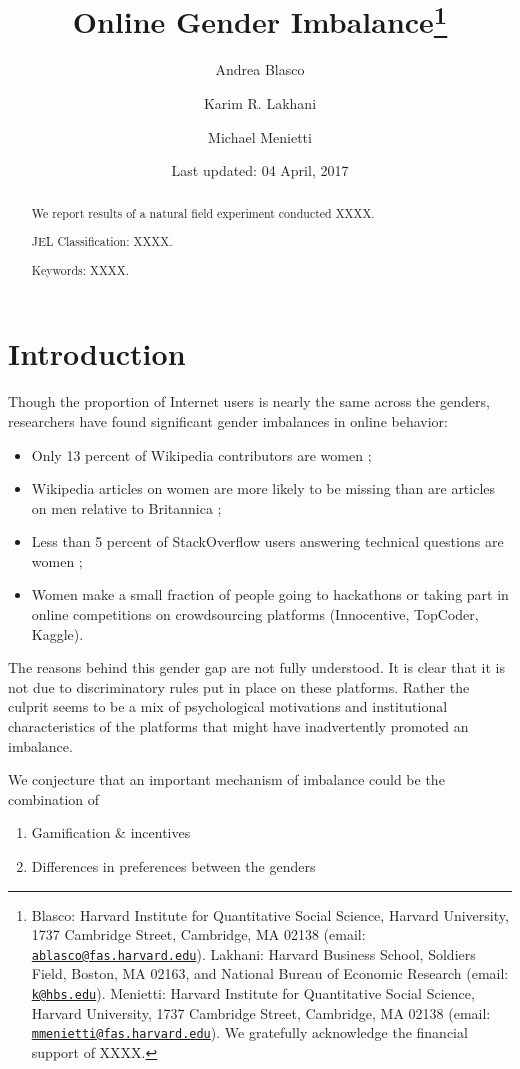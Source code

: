 \documentclass[12pt, titlepage]{article}
\institute{}
\title{Online Gender Imbalance\thanks{Blasco: Harvard Institute for Quantitative Social Science, Harvard
University, 1737 Cambridge Street, Cambridge, MA 02138 (email:
\href{mailto:ablasco@fas.harvard.edu}{\nolinkurl{ablasco@fas.harvard.edu}}).
Lakhani: Harvard Business School, Soldiers Field, Boston, MA 02163, and
National Bureau of Economic Research (email:
\href{mailto:k@hbs.edu}{\nolinkurl{k@hbs.edu}}). Menietti: Harvard
Institute for Quantitative Social Science, Harvard University, 1737
Cambridge Street, Cambridge, MA 02138 (email:
\href{mailto:mmenietti@fas.harvard.edu}{\nolinkurl{mmenietti@fas.harvard.edu}}).
We gratefully acknowledge the financial support of XXXX.}}
\author{Andrea Blasco \and Karim R. Lakhani \and Michael Menietti}
\date{Last updated: 04 April, 2017}
\providecommand{\tightlist}{%
  \setlength{\itemsep}{0pt}\setlength{\parskip}{0pt}}
\begin{document}
\maketitle
\begin{abstract}
We report results of a natural field experiment conducted XXXX.

\smallskip\noindent 
JEL Classification: XXXX.

\smallskip\noindent 
Keywords: XXXX.
\end{abstract}


\clearpage

\section{Introduction}\label{introduction}

Though the proportion of Internet users is nearly the same across the
genders, researchers have found significant gender imbalances in online
behavior:

\begin{itemize}
\tightlist
\item
  Only 13 percent of Wikipedia contributors are women
  \citep{hill2013wikipedia};
\item
  Wikipedia articles on women are more likely to be missing than are
  articles on men relative to Britannica \citep{reagle2011gender};
\item
  Less than 5 percent of StackOverflow users answering technical
  questions are women \citep{vasilescu2012gender};
\item
  Women make a small fraction of people going to hackathons or taking
  part in online competitions on crowdsourcing platforms (Innocentive,
  TopCoder, Kaggle).
\end{itemize}

The reasons behind this gender gap are not fully understood. It is clear
that it is not due to discriminatory rules put in place on these
platforms. Rather the culprit seems to be a mix of psychological
motivations and institutional characteristics of the platforms that
might have inadvertently promoted an imbalance.

We conjecture that an important mechanism of imbalance could be the
combination of

\begin{enumerate}
\def\labelenumi{\arabic{enumi}.}
\tightlist
\item
  Gamification \& incentives
\item
  Differences in preferences between the genders
\end{enumerate}
\end{document}
